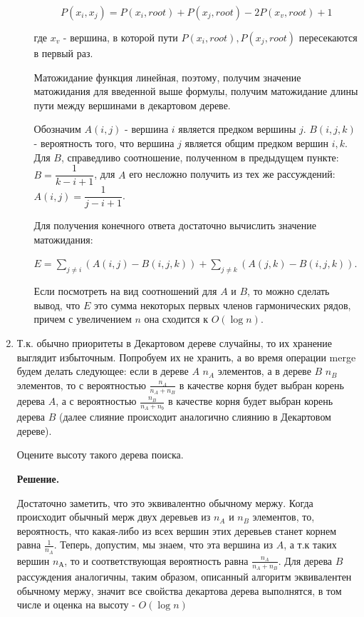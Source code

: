 \begin{enumerate}
\begin{itemize}
		$$P(x_i, x_j) = P(x_i, root) + P(x_j, root) - 2P(x_v, root) + 1$$
		
		где $x_v$ - вершина, в которой пути $P(x_i, root), P(x_j, root)$ пересекаются в первый раз.
		
		Матожидание функция линейная, поэтому, получим значение матожидания для введенной выше формулы, получим матожидание длины пути между вершинами в декартовом дереве.
		
		Обозначим $A(i, j)$ - вершина $i$ является предком вершины $j$. $B(i, j, k)$ - вероятность того, что вершина $j$ является общим предком вершин $i, k$. Для $B$, справедливо соотношение, полученном в предыдущем пункте: $B = \dfrac{1}{k - i + 1}$, для $A$ его несложно получить из тех же рассуждений: $A(i, j) = \dfrac{1}{j - i + 1}$.
		
		Для получения конечного ответа достаточно вычислить значение матожидания:
		
		$E = \sum\limits_{j\neq i}(A(i, j) - B(i, j, k)) + \sum\limits_{j \neq k}(A(j, k) - B(i, j, k))$.
		
		Если посмотреть на вид соотношений для $A$ и $B$, то можно сделать вывод, что $E$ это сумма некоторых первых членов гармонических рядов, причем с увеличением $n$ она сходится к $O(\log n)$.
		
		
	\end{itemize}
	
	\item Т.к. обычно приоритеты в Декартовом дереве случайны, то их хранение выглядит избыточным.
	Попробуем их не хранить, а во время операции merge будем делать следующее: если в дереве
	$A$ $n_A$ элементов, а в дереве $B$ $n_B$ элементов, то с вероятностью 
	$\frac{n_A}{n_A + n_B}$ в качестве корня будет выбран корень дерева $A$, а с вероятностью 
	$\frac{n_B}{n_A + n_b}$ в качестве корня будет выбран корень дерева $B$ (далее слияние 
	происходит аналогично слиянию в Декартовом дереве).
	
	Оцените высоту такого дерева поиска.
	
	\textbf{Решение.}
	
	Достаточно заметить, что это эквивалентно обычному мержу. Когда происходит обычный мерж двух деревьев из $n_A$ и $n_B$ элементов, то, вероятность, что какая-либо из всех вершин этих деревьев станет корнем равна $\frac{1}{n_A}$. Теперь, допустим, мы знаем, что эта вершина из $A$, а т.к таких вершин $n_А$, то и соответствующая вероятность равна $\frac{n_A}{n_A + n_B}$. Для дерева $B$ рассуждения аналогичны, таким образом, описанный алгоритм эквивалентен обычному мержу, значит все свойства декартова дерева выполнятся, в том числе и оценка на высоту - $O(\log n)$
	

\end{enumerate}

